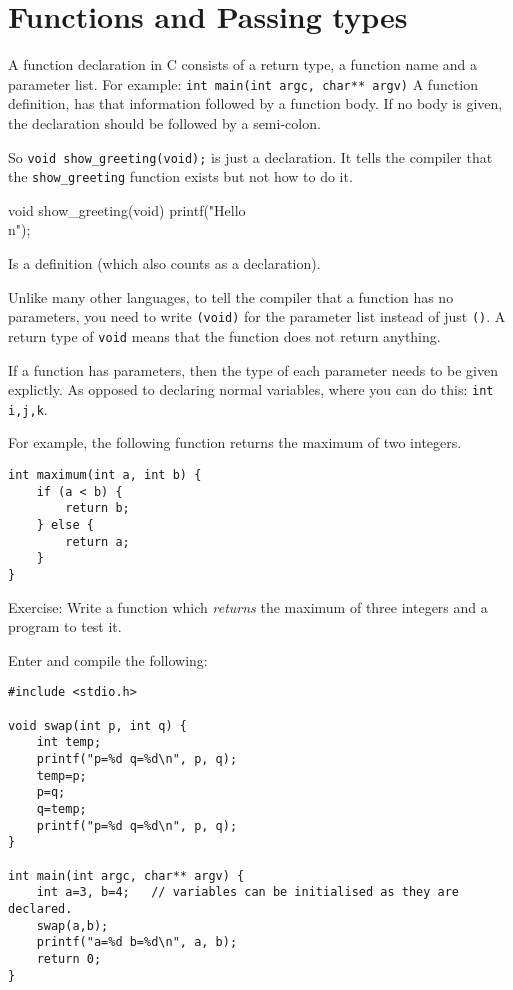 
\chapter{Functions and Passing types}

A function declaration in C consists of a return type, a function name and a parameter list.
For example:
\lstinline!int main(int argc, char** argv)!
A function definition, has that information followed by a function body. 
If no body is given, the declaration should be followed by a semi-colon.

So \lstinline!void show_greeting(void);!  is just a declaration.
It tells the compiler that the \texttt{show\_greeting} function exists but not how to do it.
\begin{lstinline}
void show_greeting(void) {
    printf("Hello\\n");
}
\end{lstinline}
Is a definition (which also counts as a declaration).

Unlike many other languages, to tell the compiler that a function has no parameters, you 
need to write \lstinline!(void)! for the parameter list instead of just \lstinline!()!.
A return type of \lstinline!void! means that the function does not return anything.

If a function has parameters, then the type of each parameter needs to be given explictly.
As opposed to declaring normal variables, where you can do this: \lstinline!int i,j,k!.

For example, the following function returns the maximum of two integers.
\begin{lstlisting}
int maximum(int a, int b) {
    if (a < b) {
        return b;
    } else {
        return a;
    }
}
\end{lstlisting}

Exercise: Write a function which \emph{returns} the maximum of three integers and a program to test it.

Enter and compile the following:
\begin{lstlisting}
#include <stdio.h>

void swap(int p, int q) {
    int temp;
    printf("p=%d q=%d\n", p, q);
    temp=p;
    p=q;
    q=temp;
    printf("p=%d q=%d\n", p, q);
}

int main(int argc, char** argv) {
    int a=3, b=4;	// variables can be initialised as they are declared.
    swap(a,b);
    printf("a=%d b=%d\n", a, b);
    return 0;
}
\end{lstlisting}

